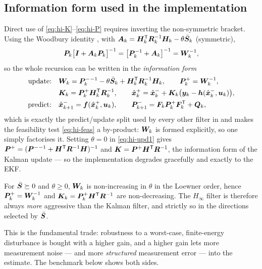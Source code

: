 \subsection{Information form used in the implementation}
Direct use of \eqref{eq:hi-K}--\eqref{eq:hi-P} requires inverting the non-symmetric bracket.  Using
the Woodbury identity \cite{woodbury1950}, \cite[\S2.1.4]{golubvanloan2013} with
$\bm{A}_k = \bm{H}_k^{\mathsf{T}}\bm{R}_k^{-1}\bm{H}_k-\theta\bar{\bm{S}}_k$ (symmetric),
\begin{equation}
\bm{P}_k\big[\bm{I}+\bm{A}_k\bm{P}_k\big]^{-1} = \big[\bm{P}_k^{-1}+\bm{A}_k\big]^{-1} = \bm{W}_k^{-1},
\label{eq:hi-woodbury}
\end{equation}
so the whole recursion can be written in the \emph{information form}
\begin{align}
\text{update:}\quad & \bm{W}_k = \bm{P}^{-}_k{}^{-1}-\theta\bar{\bm{S}}_k+\bm{H}_k^{\mathsf{T}}\bm{R}_k^{-1}\bm{H}_k,
   \qquad \bm{P}^{+}_k=\bm{W}_k^{-1}, \label{eq:hi-upd1}\\
& \bm{K}_k = \bm{P}^{+}_k\bm{H}_k^{\mathsf{T}}\bm{R}_k^{-1},\qquad
  \hat{\bm{x}}^{+}_k = \hat{\bm{x}}^{-}_k+\bm{K}_k\big(\bm{y}_k-\bm{h}(\hat{\bm{x}}^{-}_k,\bm{u}_k)\big), \label{eq:hi-upd2}\\
\text{predict:}\quad & \hat{\bm{x}}^{-}_{k+1} = \bm{f}(\hat{\bm{x}}^{+}_k,\bm{u}_k),\qquad
  \bm{P}^{-}_{k+1} = \bm{F}_k\bm{P}^{+}_k\bm{F}_k^{\mathsf{T}}+\bm{Q}_k, \label{eq:hi-pred}
\end{align}
which is exactly the predict/update split used by every other filter in  and makes the
feasibility test \eqref{eq:hi-feas} a by-product: $\bm{W}_k$ is formed explicitly, so one simply
factorises it.  Setting $\theta=0$ in \eqref{eq:hi-upd1} gives
$\bm{P}^{+}=(\bm{P}^{-}{}^{-1}+\bm{H}^{\mathsf{T}}\bm{R}^{-1}\bm{H})^{-1}$ and
$\bm{K}=\bm{P}^{+}\bm{H}^{\mathsf{T}}\bm{R}^{-1}$, the information form of the Kalman update --- so the implementation
degrades gracefully and exactly to the EKF.

\begin{proposition}\label{prop:hi-gain}
For $\bar{\bm{S}}\succeq0$ and $\theta\ge0$, $\bm{W}_k$ is non-increasing in $\theta$ in the Loewner
order, hence $\bm{P}^{+}_k=\bm{W}_k^{-1}$ and $\bm{K}_k=\bm{P}^{+}_k\bm{H}^{\mathsf{T}}\bm{R}^{-1}$ are non-decreasing.  The
$H_\infty$ filter is therefore always \emph{more} aggressive than the Kalman filter, and strictly
so in the directions selected by $\bar{\bm{S}}$.
\end{proposition}
\noindent This is the fundamental trade: robustness to a worst-case, finite-energy disturbance is
bought with a higher gain, and a higher gain lets more measurement noise --- and more
\emph{structured} measurement error --- into the estimate.  The benchmark below shows both sides.

